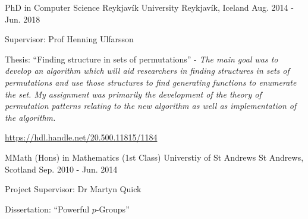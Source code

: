 


\begin{cventries}


  \cventry
  {PhD in Computer Science} %
  {Reykjavík University} %
  {Reykjavík, Iceland} %
  {Aug. 2014 - Jun. 2018} %
  {
    \begin{cvitems} %
      \item {
      Supervisor: Prof Henning Ulfarsson
      }
      \item {
      Thesis: ``Finding structure in sets of permutations'' -
      \textit{The main goal was to develop an algorithm which will aid
      researchers in finding structures in sets of permutations and use those
      structures to find generating functions to enumerate the set. My
      assignment was primarily the development of the theory of permutation
      patterns relating to the new algorithm as well as implementation of the
      algorithm.}
      }
      \item {
        \url{https://hdl.handle.net/20.500.11815/1184}
      }
    \end{cvitems}
  }


  \cventry
    {MMath (Hons) in Mathematics (1st Class)} %
    {Universtiy of St Andrews} %
    {St Andrews, Scotland} %
    {Sep. 2010 - Jun. 2014} %
    {
      \begin{cvitems} %
        \item {
        Project Supervisor: Dr Martyn Quick
        }
        \item {
        Dissertation: ``Powerful $p$-Groups'' }
      \end{cvitems}
    }

\end{cventries}
